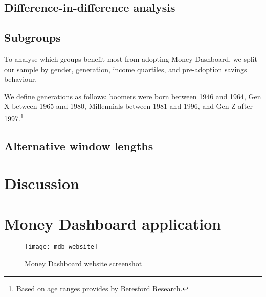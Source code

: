 \documentclass[a4paper, 11pt]{article}
\begin{document}
\subsection{Difference-in-difference analysis}%
\label{sub:difference_in_difference_analysis}

\subsection{Subgroups}%
\label{sub:subgroups}

To analyse which groups benefit most from adopting Money Dashboard, we split
our sample by gender, generation, income quartiles, and pre-adoption savings
behaviour.

We define generations as follows: boomers were born between 1946 and 1964, Gen
X between 1965 and 1980, Millennials between 1981 and 1996, and Gen Z after
1997.\footnote{Based on age ranges provides by
    \href{https://www.beresfordresearch.com/age-range-by-generation/}{Beresford
Research}.}

\subsection{Alternative window lengths}%
\label{sub:alternative_window_lengths}

% 
\section{Discussion}%
\label{sec:discussion}







\newpage
\printbibliography
\newpage

% 
\appendix

\section{Money Dashboard application}%
\label{sec:money_dashboard_application}

\begin{figure}[htpb]
    \centering
    \caption{Money Dashboard website screenshot}%
    \texttt{[image: mdb\_website]}
    \label{fig:mdb_website}
\end{figure}
\end{document}
